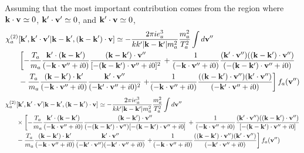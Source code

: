 \documentclass[12pt,a4paper,ruledheader]{report}
\begin{document}
\begin{appendix}
Assuming that the most important contribution comes from the region where
${\bf k}\cdot {\bf v}\simeq 0$, ${\bf k'}\cdot{\bf v'}\simeq 0$, and
${\bf k'}\cdot {\bf v}\simeq 0$,
\begin{equation}
\begin{split}
\chi_a^{(2)}&[{\bf k'},{\bf k'\cdot v'}|{\bf k-k'},({\bf k-k'})\cdot{\bf v}]
\simeq-\frac{2\pi ie_a^3}{k k'|{\bf k-k'}|m_a^2}\frac{m_a^2}{T_a^2}\int d{\bf v''}\\
&\left[-\frac{T_a}{m_a}\frac{{\bf k'}\cdot({\bf k-k'})}
{(-{\bf k}\cdot{\bf v''}+i0)}
\frac{({\bf k-k'})\cdot{\bf v''}}
   {[-({\bf k-k'})\cdot{\bf v''}+i0]^2} \right.
   + \frac{1}{(-{\bf k}\cdot{\bf v''}+i0)}
\frac{({\bf k'}\cdot{\bf v''})(({\bf k-k'})\cdot{\bf v''})}
{(-({\bf k-k'})\cdot{\bf v''}+i0)}\\
& -\frac{T_a}{m_a} \frac{({\bf k-k'})\cdot {\bf k'}}{(-{\bf k}\cdot{\bf v''}+i0)}
\frac{{\bf k'}\cdot{\bf v''}}{(-{\bf k'}\cdot{\bf v''}+i0)^2} \left.
+ \frac{1}{(-{\bf k}\cdot{\bf v''}+i0)}\frac{(({\bf k-k'})\cdot{\bf v''})
({\bf k'}\cdot{\bf v''})}{(-{\bf k'}\cdot{\bf v''}+i0)}
\right] f_a({\bf v''})
\end{split}
\end{equation}
\begin{equation}
\begin{split}
\chi_a^{(2)}&[{\bf k'},{\bf k'\cdot v'}|{\bf k-k'},({\bf k-k'})\cdot{\bf v}]
\simeq-\frac{2\pi ie_a^3}{k k'|{\bf k-k'}|m_a^2}\frac{m_a^2}{T_a^2}\int d{\bf v''}\\
&\times \left[-\frac{T_a}{m_a}
  \frac{{\bf k'}\cdot({\bf k-k'})}{(-{\bf k}\cdot{\bf v''}+i0)}
\frac{({\bf k-k'})\cdot{\bf v''}}
{(-({\bf k-k'})\cdot{\bf v''})
[-({\bf k-k'})\cdot{\bf v''}+i0]} \right.
 + \frac{1}{(-{\bf k}\cdot{\bf v''}+i0)}
\frac{({\bf k'}\cdot{\bf v''})(({\bf k-k'})\cdot{\bf v''})}
{[-({\bf k-k'})\cdot{\bf v''}+i0]}\\
&-\frac{T_a}{m_a} \frac{({\bf k-k'})\cdot {\bf k'}}
{(-{\bf k}\cdot{\bf v''}+i0)}
\frac{{\bf k'}\cdot{\bf v''}}
{(-{\bf k'}\cdot{\bf v''})(-{\bf k'}\cdot{\bf v''}+i0)}
\left. + \frac{1}{(-{\bf k}\cdot{\bf v''}+i0)}
\frac{(({\bf k-k'})\cdot{\bf v''})
({\bf k'}\cdot{\bf v''})}
{(-{\bf k'}\cdot{\bf v''}+i0)}
\right] f_a({\bf v''})
\end{split}
\end{equation}


\end{appendix}
\end{document}
